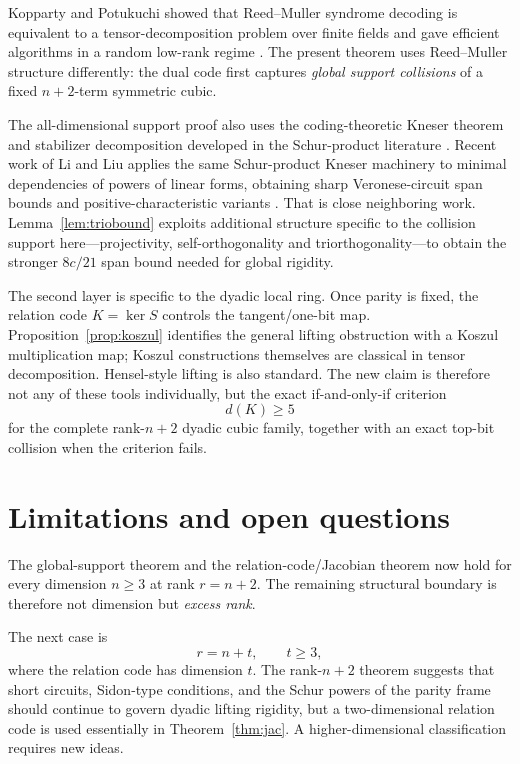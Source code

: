 \documentclass[11pt]{article}
\theoremstyle{definition}
\begin{document}
Kopparty and Potukuchi showed that Reed--Muller syndrome decoding is equivalent to a tensor-decomposition problem over finite fields and gave efficient algorithms in a random low-rank regime \cite{KoppartyPotukuchi2018}. The present theorem uses Reed--Muller structure differently: the dual code first captures \emph{global support collisions} of a fixed \(n+2\)-term symmetric cubic.

The all-dimensional support proof also uses the coding-theoretic Kneser theorem and stabilizer decomposition developed in the Schur-product literature \cite{LinZemor2026}. Recent work of Li and Liu applies the same Schur-product Kneser machinery to minimal dependencies of powers of linear forms, obtaining sharp Veronese-circuit span bounds and positive-characteristic variants \cite{LiLiu2026}. That is close neighboring work. Lemma~\ref{lem:triobound} exploits additional structure specific to the collision support here---projectivity, self-orthogonality and triorthogonality---to obtain the stronger \(8c/21\) span bound needed for global rigidity.

The second layer is specific to the dyadic local ring. Once parity is fixed, the relation code \(K=\ker S\) controls the tangent/one-bit map. Proposition~\ref{prop:koszul} identifies the general lifting obstruction with a Koszul multiplication map; Koszul constructions themselves are classical in tensor decomposition. Hensel-style lifting is also standard. The new claim is therefore not any of these tools individually, but the exact if-and-only-if criterion
\[
d(K)\ge5
\]
for the complete rank-\(n+2\) dyadic cubic family, together with an exact top-bit collision when the criterion fails.

\section{Limitations and open questions}
The global-support theorem and the relation-code/Jacobian theorem now hold for every dimension \(n\ge3\) at rank \(r=n+2\). The remaining structural boundary is therefore not dimension but \emph{excess rank}.

The next case is
\[
r=n+t,\qquad t\ge3,
\]
where the relation code has dimension \(t\). The rank-\(n+2\) theorem suggests that short circuits, Sidon-type conditions, and the Schur powers of the parity frame should continue to govern dyadic lifting rigidity, but a two-dimensional relation code is used essentially in Theorem~\ref{thm:jac}. A higher-dimensional classification requires new ideas.
\end{document}
